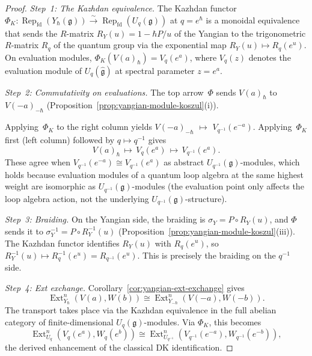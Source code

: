 \begin{proof}
\emph{Step~1: The Kazhdan equivalence.}
The Kazhdan functor~\cite{Drinfeld85}
$\Phi_K \colon \operatorname{Rep}_{\mathrm{fd}}(Y_\hbar(\mathfrak{g}))
\xrightarrow{\sim}
\operatorname{Rep}_{\mathrm{fd}}(U_q(\mathfrak{g}))$
at $q = e^\hbar$ is a monoidal equivalence that sends
the $R$-matrix $R_Y(u) = 1 - \hbar P/u$ of the Yangian
to the trigonometric $R$-matrix $R_q$ of the quantum group
via the exponential map
$R_Y(u) \mapsto R_q(e^u)$.  On evaluation modules,
$\Phi_K(V(a)_\hbar) = V_q(e^a)$, where $V_q(z)$ denotes
the evaluation module of
$U_q(\widehat{\mathfrak{g}})$ at spectral parameter
$z = e^a$.

\smallskip\noindent\emph{Step~2: Commutativity on evaluations.}
The top arrow~$\Phi$ sends $V(a)_\hbar$ to
$V(-a)_{-\hbar}$
(Proposition~\ref{prop:yangian-module-koszul}(i)).

Applying~$\Phi_K$ to the right column yields
$V(-a)_{-\hbar}$ $\mapsto$ $V_{q^{-1}}(e^{-a})$.
Applying~$\Phi_K$ first (left column) followed by
$q \mapsto q^{-1}$ gives
\[
V(a)_\hbar \,\mapsto\, V_q(e^a) \,\mapsto\, V_{q^{-1}}(e^a).
\]
These agree when
$V_{q^{-1}}(e^{-a}) \cong V_{q^{-1}}(e^a)$
as abstract $U_{q^{-1}}(\mathfrak{g})$-modules, which
holds because evaluation modules of a quantum loop
algebra at the same highest weight are isomorphic as
$U_{q^{-1}}(\mathfrak{g})$-modules
(the evaluation point only affects the loop algebra
action, not the underlying
$U_{q^{-1}}(\mathfrak{g})$-structure).

\emph{Step~3: Braiding.}
On the Yangian side, the braiding is
$\sigma_Y = P \circ R_Y(u)$, and $\Phi$ sends it to
$\sigma_Y^{-1} = P \circ R_Y^{-1}(u)$
(Proposition~\ref{prop:yangian-module-koszul}(iii)).
The Kazhdan functor identifies $R_Y(u)$ with $R_q(e^u)$,
so $R_Y^{-1}(u) \mapsto R_q^{-1}(e^u) = R_{q^{-1}}(e^u)$.
This is precisely the braiding on the $q^{-1}$ side.

\emph{Step~4: Ext exchange.}
Corollary~\ref{cor:yangian-ext-exchange} gives
\[
\operatorname{Ext}^n_{Y_\hbar}(V(a), W(b))
\cong \operatorname{Ext}^n_{Y_{-\hbar}}(V(-a), W(-b)).
\]
The transport takes place via the Kazhdan equivalence in the full
abelian category of finite-dimensional $U_q(\mathfrak{g})$-modules.
Via $\Phi_K$, this becomes
\[
\operatorname{Ext}^n_{U_q}(V_q(e^a), W_q(e^b))
\cong \operatorname{Ext}^n_{U_{q^{-1}}}(V_{q^{-1}}(e^{-a}),
W_{q^{-1}}(e^{-b})),
\]
the derived enhancement of the classical DK identification.
\end{proof}

